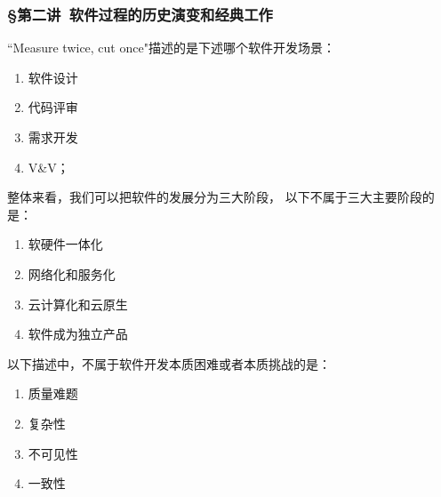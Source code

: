 \subsubsection*{\S 第二讲\ 软件过程的历史演变和经典工作}
\setcounter{problemname}{0}

\begin{problem}
	``Measure twice, cut once"描述的是下述哪个软件开发场景：
    \vspace{-0.8em}
    \begin{multicols}{4}
        \begin{enumerate}[label=\Alph*.]
            \item 软件设计
            \item 代码评审
            \item 需求开发
            \item V\&V；
        \end{enumerate}
    \end{multicols}
    \vspace{-1em}
\end{problem}



\begin{problem}
	整体来看，我们可以把软件的发展分为三大阶段， 以下不属于三大主要阶段的是：
    \vspace{-0.8em}
    \begin{multicols}{4}
        \begin{enumerate}[label=\Alph*.]
            \item 软硬件一体化
            \item 网络化和服务化
            \item 云计算化和云原生
            \item 软件成为独立产品
        \end{enumerate}
    \end{multicols}
    \vspace{-1em}
\end{problem}




\begin{problem}
	以下描述中，不属于软件开发本质困难或者本质挑战的是：
    \vspace{-0.8em}
    \begin{multicols}{4}
        \begin{enumerate}[label=\Alph*.]
            \item 质量难题
            \item 复杂性
            \item 不可见性
            \item 一致性
        \end{enumerate}
    \end{multicols}
    \vspace{-1em}
\end{problem}




